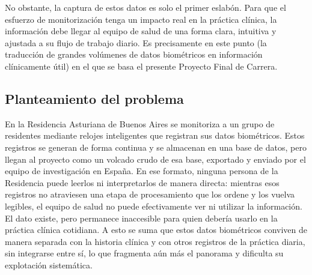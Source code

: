 \documentclass[12pt,a4paper]{article}
\begin{document}
    No obstante, la captura de estos datos es solo el primer eslabón. Para que el esfuerzo de monitorización tenga un impacto real en la práctica clínica, la información debe llegar al equipo de salud de una forma clara, intuitiva y ajustada a su flujo de trabajo diario. Es precisamente en este punto (la traducción de grandes volúmenes de datos biométricos en información clínicamente útil) en el que se basa el presente Proyecto Final de Carrera.

    \subsection{Planteamiento del problema}
    En la Residencia Asturiana de Buenos Aires se monitoriza a un grupo de residentes mediante relojes inteligentes que registran sus datos biométricos. Estos registros se generan de forma continua y se almacenan en una base de datos, pero llegan al proyecto como un volcado crudo de esa base, exportado y enviado por el equipo de investigación en España. En ese formato, ninguna persona de la Residencia puede leerlos ni interpretarlos de manera directa: mientras esos registros no atraviesen una etapa de procesamiento que los ordene y los vuelva legibles, el equipo de salud no puede efectivamente ver ni utilizar la información. El dato existe, pero permanece inaccesible para quien debería usarlo en la práctica clínica cotidiana. A esto se suma que estos datos biométricos conviven de manera separada con la historia clínica y con otros registros de la práctica diaria, sin integrarse entre sí, lo que fragmenta aún más el panorama y dificulta su explotación sistemática.
\end{document}

